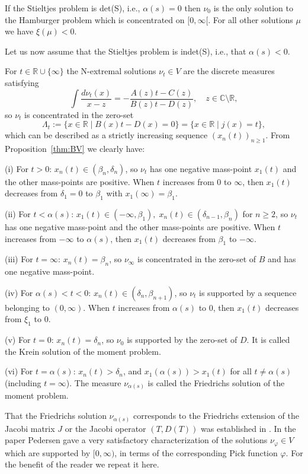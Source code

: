 \documentclass[12pt]{article}
\newcommand{\C}{\mathbb{C}}
\newcommand{\R}{\mathbb{R}}
\def\C{\mathbb{C}}
\def\R{\mathbb{R}}
\begin{document}
If the Stieltjes problem is det(S), i.e., $\alpha(s)=0$ then $\nu_0$ is the only solution to the Hamburger problem which is concentrated on $[0,\infty[$.  For all other solutions $\mu$ we have $\xi(\mu)<0$.   

Let us now assume that the Stieltjes problem is indet(S), i.e., that $\alpha(s)<0$.

For $t\in\R\cup\{\infty\}$ the N-extremal solutions $\nu_t\in V$ are the discrete  
measures satisfying
\begin{equation}\label{eq:Nev-par-ext}
\int\frac{d\nu_t(x)}{x-z}=-\frac{A(z)t-C(z)}{B(z)t-D(z)},\quad z\in\C\setminus\R,
\end{equation}
so $\nu_t$ is concentrated in the zero-set 
$$
\Lambda_t:=\{x\in\R \mid B(x)t-D(x)=0\}=\{x\in\R \mid j(x)=t\},
$$
which can be described as a strictly increasing sequence $(x_n(t))_{n\ge 1}$.
From Proposition~\ref{thm:BV} we clearly have:

(i) For $t>0$: $x_n(t)\in (\beta_n,\delta_n)$, so $\nu_t$ has one negative mass-point $x_1(t)$  and
the other mass-points are positive. When $t$ increases from 0 to $\infty$, then $x_1(t)$ decreases from $\delta_1=0$ to $\beta_1$ with  $x_1(\infty)=\beta_1$. 

(ii) For $t<\alpha(s)$: $x_1(t)\in (-\infty,\beta_1),\;x_n(t)\in (\delta_{n-1},\beta_n)$ for $n\ge 2$, so $\nu_t$ has one negative mass-point and the other mass-points are positive.
When $t$ increases from $-\infty$ to $\alpha(s)$, then $x_1(t)$ decreases from $\beta_1$ to $-\infty$.

(iii) For $t=\infty$: $x_n(t)=\beta_n$, so $\nu_\infty$ is concentrated in the zero-set of $B$ and has one negative mass-point.

(iv) For $\alpha(s)< t< 0$: $x_n(t)\in (\delta_n,\beta_{n+1})$, so $\nu_t$ is supported by a sequence belonging to $(0,\infty)$. When $t$ increases from $\alpha(s)$ to 0, then $x_1(t)$ decreases from $\xi_1$ to 0.

(v) For $t=0$: $x_n(t)=\delta_n$, so $\nu_0$ is supported by the zero-set of $D$. It is called the Krein solution of the moment problem.

(vi) For $t=\alpha(s)$: $x_n(t)>\delta_n$, and $x_1(\alpha(s))>x_1(t)$ for all $t\neq \alpha(s)$ (including $t=\infty$). The measure $\nu_{\alpha(s)}$ is called the Friedrichs solution of the moment problem. 

That the Friedrichs solution $\nu_{\alpha(s)}$ corresponds to the Friedrichs extension of the  Jacobi matrix $J$  or the Jacobi operator $(T,D(T))$ was established in \cite{Pe1}. In the paper \cite{Pe2} Pedersen gave a very satisfactory characterization of the solutions $\nu_{\varphi}\in V$ which are supported by $[0,\infty)$, in terms of the corresponding Pick function $\varphi$. For the benefit of the reader we repeat it here.
\end{document}
